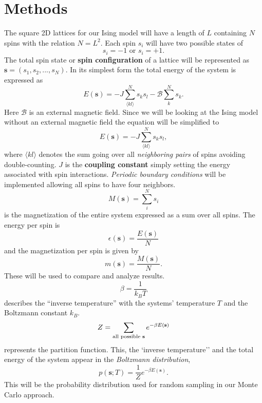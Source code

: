 \documentclass[english,notitlepage,reprint,nofootinbib]{revtex4-1}  %
\begin{document}
\section{Methods}\label{sec:methods}
The square 2D lattices for our Ising model will have a length of $L$ containing $N$ spins with the relation $N = L^2$. Each spin $s_i$ will have two possible states of 
\begin{equation*}
    s_i = -1 \text{ or } s_i = +1.
\end{equation*}
The total spin state or \textbf{spin configuration} of a lattice will be represented as $\textbf{s} = (s_1, s_2, ..., s_N)$. In its simplest form the total energy of the system is expressed as
\begin{equation*}
    E(\textbf{s}) = - J \sum^N_{\langle kl \rangle} s_k s_l - \mathscr{B} \sum^N_{k} s_k.
\end{equation*}
Here $\mathscr{B}$ is an external magnetic field. Since we will be looking at the Ising model without an external magnetic field the equation will be simplified to
\begin{equation}
    E(\textbf{s}) = - J \sum^N_{\langle kl \rangle} s_k s_l,
\end{equation}
where $\langle kl \rangle$ denotes the sum going over all \textit{neighboring pairs} of spins avoiding double-counting. $J$ is the \textbf{coupling constant} simply setting the energy associated with spin interactions. \textit{Periodic boundary conditions} will be implemented allowing all spins to have four neighbors.
\begin{equation}
    M(\textbf{s}) = \sum^N_i s_i
\end{equation}
is the magnetization of the entire system expressed as a sum over all spins. The energy per spin is
\begin{equation}
    \epsilon(\textbf{s}) = \frac{E(\textbf{s})}{N} \label{eq:mean_E}
\end{equation}
and the magnetization per spin is given by
\begin{equation}
    m(\textbf{s}) = \frac{M(\textbf{s})}{N}. \label{eq:mean_M}
\end{equation}
These will be used to compare and analyze results.
\begin{equation}
    \beta = \frac{1}{k_B T}
\end{equation}
describes the ``inverse temperature'' with the systems' temperature $T$ and the Boltzmann constant $k_B$.
\begin{equation}
    Z = \sum_{\text{all possible \textbf{s}}} e^{- \beta E(\textbf{s})}
\end{equation}
represents the partition function. This, the `inverse temperature'' and the total energy of the system appear in the \textit{Boltzmann distribution},
\begin{equation}
    p(\textbf{s};T) = \frac{1}{Z} e^{-\beta E(\textbf{s})}.\label{eq:prob_dist}
\end{equation}
This will be the probability distribution used for random sampling in our Monte Carlo approach. 
\end{document}
